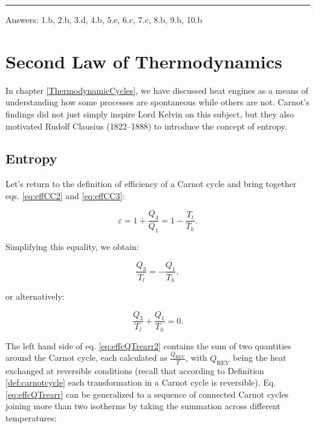\documentclass[
  9pt,
]{extbook}
\theoremstyle{definition}
\theoremstyle{definition}
\theoremstyle{definition}
\theoremstyle{definition}
\theoremstyle{remark}
\begin{document}
\begin{center}\rule{0.5\linewidth}{0.5pt}\end{center}

Answers: 1.b, 2.b, 3.d, 4.b, 5.e, 6.c, 7.c, 8.b, 9.b, 10.b

\chapter{Second Law of Thermodynamics}\label{SecondLaw}

In chapter \ref{ThermodynamicCycles}, we have discussed heat engines as a means of understanding how some processes are spontaneous while others are not. Carnot's findings did not just simply inspire Lord Kelvin on this subject, but they also motivated Rudolf Clausius (1822--1888) to introduce the concept of entropy.

\section{Entropy}\label{entropyint}

Let's return to the definition of efficiency of a Carnot cycle and bring together eqs. \eqref{eq:effCC2} and \eqref{eq:effCC3}:

\begin{equation}
\varepsilon = 1+\frac{Q_3}{Q_1} = 1-\frac{T_l}{T_h}.
\label{eq:effcQT}
\end{equation}

Simplifying this equality, we obtain:

\begin{equation}
\frac{Q_3}{T_l} = -\frac{Q_1}{T_h},
\label{eq:effcQTrearr}
\end{equation}

or alternatively:

\begin{equation}
\frac{Q_3}{T_l} + \frac{Q_1}{T_h} = 0.
\label{eq:effcQTrearr2}
\end{equation}

The left hand side of eq. \eqref{eq:effcQTrearr2} contains the sum of two quantities around the Carnot cycle, each calculated as \(\frac{Q_{\mathrm{REV}}}{T}\), with \(Q_{\mathrm{REV}}\) being the heat exchanged at reversible conditions (recall that according to Definition \ref{def:carnotcycle} each transformation in a Carnot cycle is reversible). Eq. \eqref{eq:effcQTrearr} can be generalized to a sequence of connected Carnot cycles joining more than two isotherms by taking the summation across different temperatures:
\end{document}
